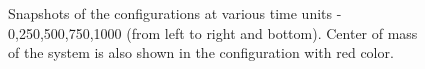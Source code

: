 \documentclass{article}
\begin{document}
\begin{figure}[H]
\hfill
\caption{Snapshots of the configurations at various time units - 0,250,500,750,1000 (from left to right and bottom). Center of mass of the system is also shown in the configuration with red color.}
\end{figure}
\end{document}
